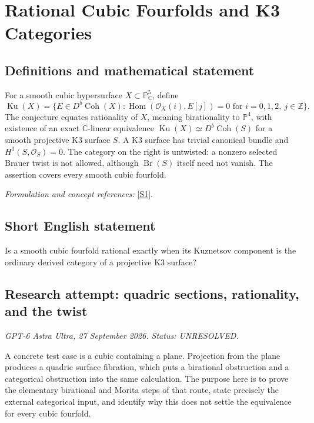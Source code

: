 \documentclass[11pt]{article}
\begin{document}
\section*{\texorpdfstring{Rational Cubic Fourfolds and K3 Categories}{Rational Cubic Fourfolds and K3 Categories}}\label{statement}
\subsection{Definitions and mathematical statement}
For a smooth cubic hypersurface $X\subset{\mathbb{P}}^5_{{\mathbb{C}}}$, define
\[
 \operatorname{Ku}(X)=\{E\in D^b\operatorname{Coh}(X):
 \operatorname{Hom}(\mathcal O_X(i),E[j])=0\text{ for }i=0,1,2,\ j\in{\mathbb{Z}}\}.
\]
The conjecture equates rationality of $X$, meaning birationality to ${\mathbb{P}}^4$, with existence of an exact ${\mathbb{C}}$-linear equivalence
$\operatorname{Ku}(X)\simeq D^b\operatorname{Coh}(S)$ for a smooth projective K3 surface $S$. A K3 surface has trivial canonical bundle and $H^1(S,\mathcal O_S)=0$. The category on the right is untwisted: a nonzero selected Brauer twist is not allowed, although $\operatorname{Br}(S)$ itself need not vanish. The assertion covers every smooth cubic fourfold.
\par\smallskip\textit{Formulation and concept references:} \href{https://arxiv.org/pdf/0808.3351v1}{[S1]}.

\subsection{Short English statement}
Is a smooth cubic fourfold rational exactly when its Kuznetsov component is the ordinary derived category of a projective K3 surface?
\subsection{Research attempt: quadric sections, rationality, and the twist}
\textit{GPT-6 Astra Ultra, 27 September 2026. Status: UNRESOLVED.}

A concrete test case is a cubic containing a plane. Projection from the plane produces a quadric surface fibration, which puts a birational obstruction and a categorical obstruction into the same calculation. The purpose here is to prove the elementary birational and Morita steps of that route, state precisely the external categorical input, and identify why this does not settle the equivalence for every cubic fourfold.
\end{document}
